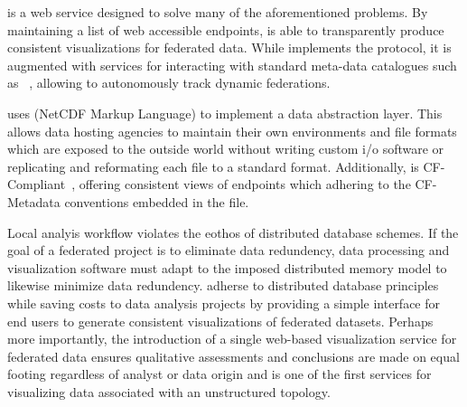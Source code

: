  \sciwms{} is a web service designed to solve many of the
aforementioned problems. By maintaining a list of web accessible
endpoints, \sciwms{} is able to transparently produce consistent
visualizations for federated data. While \sciwms{} implements the
\ogc{} \wms{} protocol, it is augmented with services for interacting
with standard meta-data catalogues such as \csw{}~\cite{csw14},
allowing \sciwms{} to autonomously track dynamic federations.

\sciwms{} uses \ncml{} (NetCDF Markup Language) to implement a data
abstraction layer. This allows data hosting agencies to maintain their
own environments and file formats which are exposed to the outside
world without writing custom i/o software or replicating and
reformating each file to a standard format. Additionally, \sciwms{} is
CF-Compliant~\cite{cf}, offering consistent views of endpoints which
adhering to the CF-Metadata conventions embedded in the \ncml{} file.

Local analyis workflow violates the eothos of distributed database
schemes. If the goal of a federated project is to eliminate data
redundency, data processing and visualization software must adapt to
the imposed distributed memory model to likewise minimize data
redundency. \sciwms{} adherse to distributed database principles while
saving costs to data analysis projects by providing a simple interface
for end users to generate consistent visualizations of federated
datasets. Perhaps more importantly, the introduction of a single
web-based visualization service for federated data ensures qualitative
assessments and conclusions are made on equal footing regardless of
analyst or data origin and is one of the first services for
visualizing data associated with an unstructured topology.
